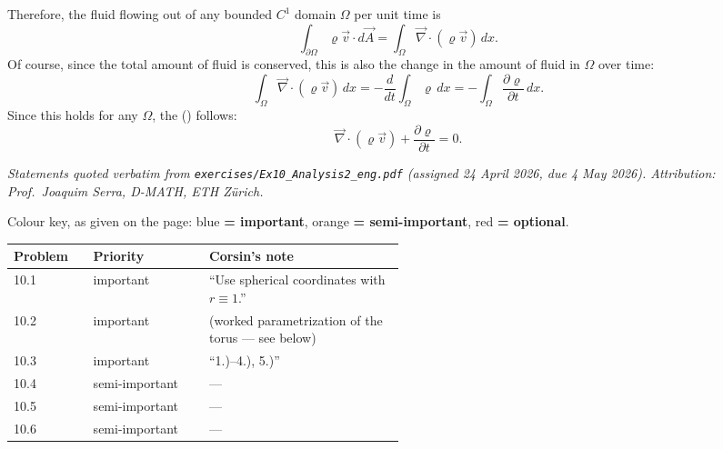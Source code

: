 \begin{center}
\end{center}

Therefore, the fluid flowing out of any bounded $C^1$ domain $\Omega$ per unit time is
\[\int_{\partial\Omega} \varrho\vec v\cdot d\vec A = \int_\Omega \vec\nabla\cdot(\varrho
  \vec v)\,dx.\]
Of course, since the total amount of fluid is conserved, this is also the change in the
amount of fluid in $\Omega$ over time:
\[\int_\Omega \vec\nabla\cdot(\varrho\vec v)\,dx = -\frac{d}{dt}\int_\Omega \varrho\,dx
  = -\int_\Omega \frac{\partial\varrho}{\partial t}\,dx.\]
Since this holds for any $\Omega$, the 
() follows:
\[\vec\nabla\cdot(\varrho\vec v) + \frac{\partial\varrho}{\partial t} = 0.\]


\textit{Statements quoted verbatim from \texttt{exercises/Ex10\_Analysis2\_eng.pdf} (assigned
24 April 2026, due 4 May 2026). Attribution: Prof.\ Joaquim Serra, D-MATH, ETH Z\"urich.}

\begin{ainote}
Colour key, as given on the page: blue \textbf{= important}, orange \textbf{= semi-important},
red \textbf{= optional}.

\begin{center}
\begin{tabular}{@{}l l p{0.5\linewidth}@{}}
\textbf{Problem} & \textbf{Priority} & \textbf{Corsin's note} \\
\hline
10.1 & important & ``Use spherical coordinates with $r\equiv1$.'' \\[3pt]
10.2 & important & (worked parametrization of the torus --- see below) \\[3pt]
10.3 & important & ``1.)--4.), 5.)'' \\[3pt]
10.4 & semi-important & --- \\[3pt]
10.5 & semi-important & --- \\[3pt]
10.6 & semi-important & --- \\
\end{tabular}
\end{center}
\end{ainote}

